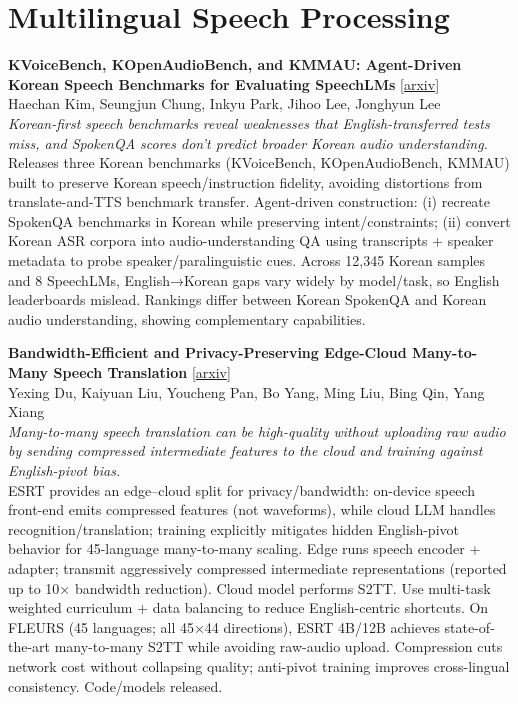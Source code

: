 \documentclass[12pt,letterpaper]{article}
\begin{document}
\medskip


\section*{Multilingual Speech Processing}

{\small\textbf{KVoiceBench, KOpenAudioBench, and KMMAU: Agent-Driven Korean Speech Benchmarks for Evaluating SpeechLMs}} {\scriptsize[\href{https://arxiv.org/abs/2605.27984}{arxiv}]}\\
{\scriptsize Haechan Kim, Seungjun Chung, Inkyu Park, Jihoo Lee, Jonghyun Lee}\\

{\small\textit{Korean-first speech benchmarks reveal weaknesses that English-transferred tests miss, and SpokenQA scores don't predict broader Korean audio understanding.}}\\[1pt]
{\footnotesize Releases three Korean benchmarks (KVoiceBench, KOpenAudioBench, KMMAU) built to preserve Korean speech/instruction fidelity, avoiding distortions from translate-and-TTS benchmark transfer. Agent-driven construction: (i) recreate SpokenQA benchmarks in Korean while preserving intent/constraints; (ii) convert Korean ASR corpora into audio-understanding QA using transcripts + speaker metadata to probe speaker/paralinguistic cues. Across 12,345 Korean samples and 8 SpeechLMs, English→Korean gaps vary widely by model/task, so English leaderboards mislead. Rankings differ between Korean SpokenQA and Korean audio understanding, showing complementary capabilities.}

\medskip

{\small\textbf{Bandwidth-Efficient and Privacy-Preserving Edge-Cloud Many-to-Many Speech Translation}} {\scriptsize[\href{https://arxiv.org/abs/2605.28642}{arxiv}]}\\
{\scriptsize Yexing Du, Kaiyuan Liu, Youcheng Pan, Bo Yang, Ming Liu, Bing Qin, Yang Xiang}\\

{\small\textit{Many-to-many speech translation can be high-quality without uploading raw audio by sending compressed intermediate features to the cloud and training against English-pivot bias.}}\\[1pt]
{\footnotesize ESRT provides an edge--cloud split for privacy/bandwidth: on-device speech front-end emits compressed features (not waveforms), while cloud LLM handles recognition/translation; training explicitly mitigates hidden English-pivot behavior for 45-language many-to-many scaling. Edge runs speech encoder + adapter; transmit aggressively compressed intermediate representations (reported up to 10× bandwidth reduction). Cloud model performs S2TT. Use multi-task weighted curriculum + data balancing to reduce English-centric shortcuts. On FLEURS (45 languages; all 45×44 directions), ESRT 4B/12B achieves state-of-the-art many-to-many S2TT while avoiding raw-audio upload. Compression cuts network cost without collapsing quality; anti-pivot training improves cross-lingual consistency. Code/models released.}
\end{document}
